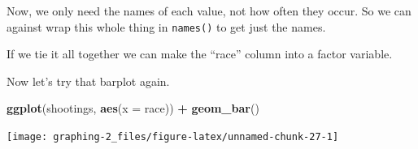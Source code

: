 \documentclass[
  12pt,
]{book}
\newenvironment{Shaded}{\begin{snugshade}}{\end{snugshade}}
\newcommand{\CommentTok}[1]{\textcolor[rgb]{0.56,0.35,0.01}{\textit{#1}}}
\newcommand{\DataTypeTok}[1]{\textcolor[rgb]{0.13,0.29,0.53}{#1}}
\newcommand{\KeywordTok}[1]{\textcolor[rgb]{0.13,0.29,0.53}{\textbf{#1}}}
\newcommand{\NormalTok}[1]{#1}
\newcommand{\OperatorTok}[1]{\textcolor[rgb]{0.81,0.36,0.00}{\textbf{#1}}}
\newcommand{\OtherTok}[1]{\textcolor[rgb]{0.56,0.35,0.01}{#1}}
\newcommand{\StringTok}[1]{\textcolor[rgb]{0.31,0.60,0.02}{#1}}
\begin{document}
\begin{Shaded}
\end{Shaded}

Now, we only need the names of each value, not how often they occur. So we can against wrap this whole thing in \texttt{names()} to get just the names.

\begin{Shaded}
\end{Shaded}

If we tie it all together we can make the ``race'' column into a factor variable.

\begin{Shaded}
\end{Shaded}

Now let's try that barplot again.

\begin{Shaded}
\begin{Highlighting}[]
\KeywordTok{ggplot}\NormalTok{(shootings, }\KeywordTok{aes}\NormalTok{(}\DataTypeTok{x =}\NormalTok{ race)) }\OperatorTok{+}\StringTok{ }
\StringTok{  }\KeywordTok{geom\_bar}\NormalTok{() }
\end{Highlighting}
\end{Shaded}

\begin{center}\texttt{[image: graphing-2\_files/figure-latex/unnamed-chunk-27-1]} \end{center}
\end{document}
